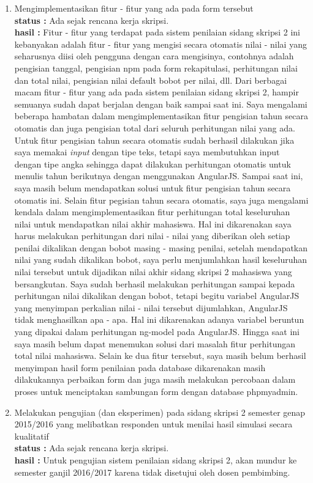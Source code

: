 \documentclass[a4paper,twoside]{article}
\begin{document}
\begin{enumerate}
		\item Mengimplementasikan fitur - fitur yang ada pada form tersebut\\
		{\bf status :} Ada sejak rencana kerja skripsi.\\
		{\bf hasil :} Fitur - fitur yang terdapat pada sistem penilaian sidang skripsi 2 ini kebanyakan adalah fitur - fitur yang mengisi secara otomatis nilai - nilai yang seharusnya diisi oleh pengguna dengan cara mengisinya, contohnya adalah pengisian tanggal, pengisian npm pada form rekapitulasi, perhitungan nilai dan total nilai, pengisian nilai default bobot per nilai, dll. Dari berbagai macam fitur - fitur yang ada pada sistem penilaian sidang skripsi 2, hampir semuanya sudah dapat berjalan dengan baik sampai saat ini. Saya mengalami beberapa hambatan dalam mengimplementasikan fitur pengisian tahun secara otomatis dan juga pengisian total dari seluruh perhitungan nilai yang ada. Untuk fitur pengisian tahun secara otomatis sudah berhasil dilakukan jika saya memakai \textit{input} dengan tipe teks, tetapi saya membutuhkan input dengan tipe angka sehingga dapat dilakukan perhitungan otomatis untuk menulis tahun berikutnya dengan menggunakan AngularJS. Sampai saat ini, saya masih belum mendapatkan solusi untuk fitur pengisian tahun secara otomatis ini. Selain fitur pegisian tahun secara otomatis, saya juga mengalami kendala dalam mengimplementasikan fitur perhitungan total keseluruhan nilai untuk mendapatkan nilai akhir mahasiswa. Hal ini dikarenakan saya harus melakukan perhitungan dari nilai - nilai yang diberikan oleh setiap penilai dikalikan dengan bobot masing - masing penilai, setelah mendapatkan nilai yang sudah dikalikan bobot, saya perlu menjumlahkan hasil keseluruhan nilai tersebut untuk dijadikan nilai akhir sidang skripsi 2 mahasiswa yang bersangkutan. Saya sudah berhasil melakukan perhitungan sampai kepada perhitungan nilai dikalikan dengan bobot, tetapi begitu variabel AngularJS yang menyimpan perkalian nilai - nilai tersebut dijumlahkan, AngularJS tidak menghasilkan apa - apa. Hal ini dikarenakan adanya variabel beruntun yang dipakai dalam perhitungan ng-model pada AngularJS. Hingga saat ini saya masih belum dapat menemukan solusi dari masalah fitur perhitungan total nilai mahasiswa. Selain ke dua fitur tersebut, saya masih belum berhasil menyimpan hasil form penilaian pada database dikarenakan masih dilakukannya perbaikan form dan juga masih melakukan percobaan dalam proses untuk menciptakan sambungan form dengan database phpmyadmin.

		\item Melakukan pengujian (dan eksperimen) pada sidang skripsi 2 semester genap 2015/2016 yang melibatkan responden untuk menilai hasil simulasi secara kualitatif\\
		{\bf status :} Ada sejak rencana kerja skripsi.\\
		{\bf hasil :} Untuk pengujian sistem penilaian sidang skripsi 2, akan mundur ke semester ganjil 2016/2017 karena tidak disetujui oleh dosen pembimbing.


\end{enumerate}
\end{document}
